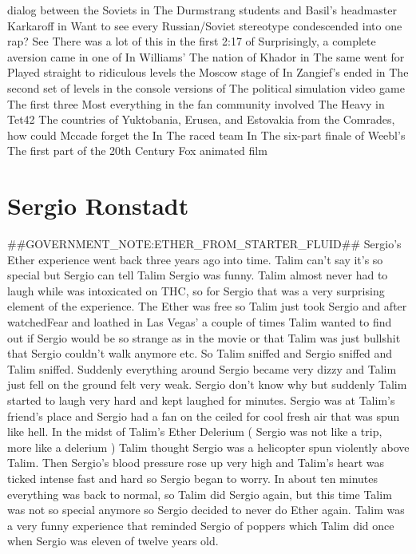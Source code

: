 \documentclass[12pt]{book}
\begin{document}
dialog between the Soviets in The Durmstrang students and Basil's headmaster Karkaroff in Want to see every Russian/Soviet stereotype condescended into one rap? See There was a lot of this in the first 2:17 of Surprisingly, a complete aversion came in one of In Williams' The nation of Khador in The same went for Played straight to ridiculous levels the Moscow stage of In Zangief's ended in The second set of levels in the console versions of The political simulation video game The first three Most everything in the fan community involved The Heavy in Tet42 The countries of Yuktobania, Erusea, and Estovakia from the Comrades, how could Mccade forget the In The raced team In The six-part finale of Weebl's The first part of the 20th Century Fox animated film



\chapter{Sergio Ronstadt}

\#\#GOVERNMENT\_NOTE:ETHER\_FROM\_STARTER\_FLUID\#\# Sergio's Ether experience went back three years ago into time. Talim can't say it's so special but Sergio can tell Talim Sergio was funny. Talim almost never had to laugh while was intoxicated on THC, so for Sergio that was a very surprising element of the experience. The Ether was free so Talim just took Sergio and after watchedFear and loathed in Las Vegas' a couple of times Talim wanted to find out if Sergio would be so strange as in the movie or that Talim was just bullshit that Sergio couldn't walk anymore etc. So Talim sniffed and Sergio sniffed and Talim sniffed. Suddenly everything around Sergio became very dizzy and Talim just fell on the ground felt very weak. Sergio don't know why but suddenly Talim started to laugh very hard and kept laughed for minutes. Sergio was at Talim's friend's place and Sergio had a fan on the ceiled for cool fresh air that was spun like hell. In the midst of Talim's Ether Delerium ( Sergio was not like a trip, more like a delerium ) Talim thought Sergio was a helicopter spun violently above Talim. Then Sergio's blood pressure rose up very high and Talim's heart was ticked intense fast and hard so Sergio began to worry. In about ten minutes everything was back to normal, so Talim did Sergio again, but this time Talim was not so special anymore so Sergio decided to never do Ether again. Talim was a very funny experience that reminded Sergio of poppers which Talim did once when Sergio was eleven of twelve years old.
\end{document}
